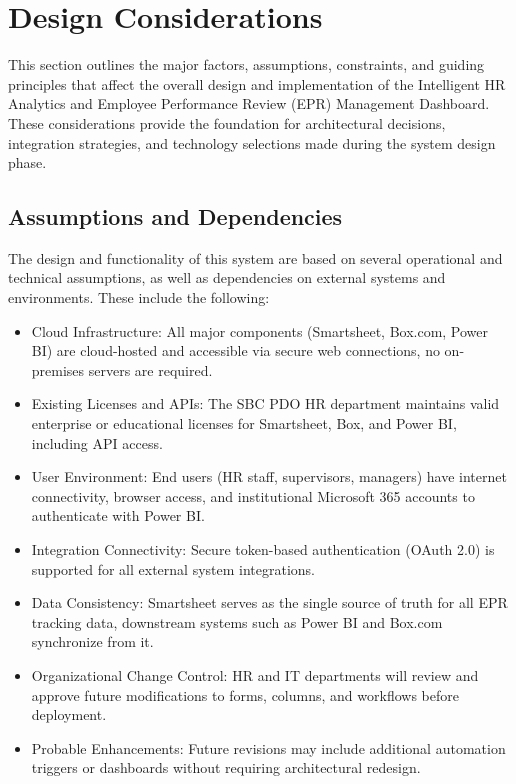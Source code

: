 \documentclass[12pt]{article}
\def\textbf#1{#1}%
\def\&{ and }%
\begin{document}
\section{Design Considerations}

This section outlines the major factors, assumptions, constraints, and guiding principles that affect the overall design and implementation of the \textbf{Intelligent HR Analytics \& Employee Performance Review (EPR) Management Dashboard}.
These considerations provide the foundation for architectural decisions, integration strategies, and technology selections made during the system design phase.

\subsection{Assumptions and Dependencies}

The design and functionality of this system are based on several operational and technical assumptions, as well as dependencies on external systems and environments.
These include the following:

\begin{itemize}[nosep]
    \item \textbf{Cloud Infrastructure:} All major components (Smartsheet, Box.com, Power BI) are cloud-hosted and accessible via secure web connections, no on-premises servers are required.
    \item \textbf{Existing Licenses and APIs:} The SBC PDO HR department maintains valid enterprise or educational licenses for Smartsheet, Box, and Power BI, including API access.
    \item \textbf{User Environment:} End users (HR staff, supervisors, managers) have internet connectivity, browser access, and institutional Microsoft 365 accounts to authenticate with Power BI.
    \item \textbf{Integration Connectivity:} Secure token-based authentication (OAuth 2.0) is supported for all external system integrations.
    \item \textbf{Data Consistency:} Smartsheet serves as the single source of truth for all EPR tracking data, downstream systems such as Power BI and Box.com synchronize from it.
    \item \textbf{Organizational Change Control:} HR and IT departments will review and approve future modifications to forms, columns, and workflows before deployment.
    \item \textbf{Probable Enhancements:} Future revisions may include additional automation triggers or dashboards without requiring architectural redesign.
\end{itemize}
\end{document}
